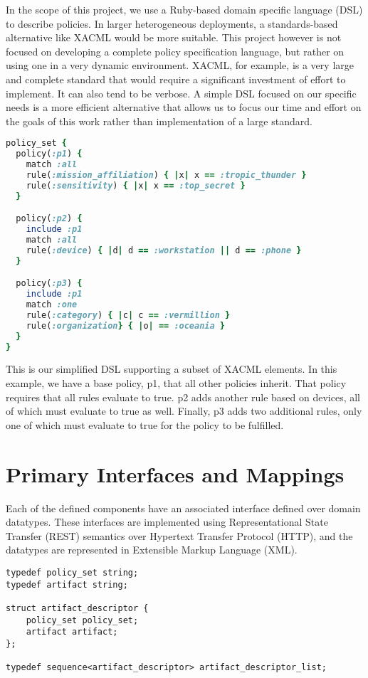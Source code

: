 In the scope of this project, we use a Ruby-based domain specific language (DSL) to describe policies.  In larger heterogeneous deployments, a standards-based alternative like XACML would be more suitable.  This project however is not focused on developing a complete policy specification language, but rather on using one in a very dynamic environment.  XACML, for example, is a very large and complete standard that would require a significant investment of effort to implement.  It can also tend to be verbose.  A simple DSL focused on our specific needs is a more efficient alternative that allows us to focus our time and effort on the goals of this work rather than implementation of a large standard.

\begin{lstlisting}[language=ruby, label=lst:policy-dsl, caption=Policy DSL Example]
policy_set {
  policy(:p1) {
    match :all
    rule(:mission_affiliation) { |x| x == :tropic_thunder }
    rule(:sensitivity) { |x| x == :top_secret }
  }

  policy(:p2) {
    include :p1
    match :all
    rule(:device) { |d| d == :workstation || d == :phone }
  }

  policy(:p3) {
    include :p1
    match :one
    rule(:category) { |c| c == :vermillion }
    rule(:organization} { |o| == :oceania }
  }
}
\end{lstlisting}

This is our simplified DSL supporting a subset of XACML elements.  In this example, we have a base policy, p1, that all other policies inherit.  That policy requires that all rules evaluate to true.  p2 adds another rule based on devices, all of which must evaluate to true as well.  Finally, p3 adds two additional rules, only one of which must evaluate to true for the policy to be fulfilled.

\section{Primary Interfaces and Mappings}
Each of the defined components have an associated interface defined over domain datatypes. These interfaces are implemented using Representational State Transfer (REST) semantics over Hypertext Transfer Protocol (HTTP), and the datatypes are represented in Extensible Markup Language (XML).

\begin{lstlisting}[language=idl, label=lst:artifact-data-types, caption=Key Artifact Dataypes]
typedef policy_set string;
typedef artifact string;

struct artifact_descriptor {
	policy_set policy_set;
	artifact artifact;
};

typedef sequence<artifact_descriptor> artifact_descriptor_list;
\end{lstlisting}

